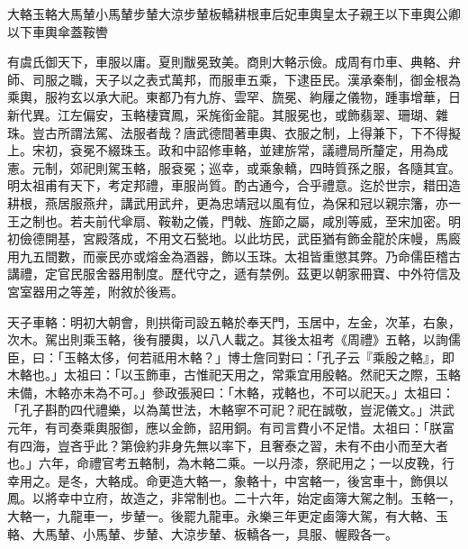 
大輅玉輅大馬輦小馬輦步輦大涼步輦板轎耕根車后妃車輿皇太子親王以下車輿公卿以下車輿傘蓋鞍轡

有虞氏御天下，車服以庸。夏則黻冕致美。商則大輅示儉。成周有巾車、典輅、弁師、司服之職，天子以之表式萬邦，而服車五乘，下逮臣民。漢承秦制，御金根為乘輿，服袀玄以承大祀。東都乃有九斿、雲罕、旒冕、絇屨之儀物，踵事增華，日新代異。江左偏安，玉輅棲寶鳳，采旄銜金龍。其服冕也，或飾翡翠、珊瑚、雜珠。豈古所謂法駕、法服者哉？唐武德間著車輿、衣服之制，上得兼下，下不得擬上。宋初，袞冕不綴珠玉。政和中詔修車輅，並建旂常，議禮局所釐定，用為成憲。元制，郊祀則駕玉輅，服袞冕；巡幸，或乘象轎，四時質孫之服，各隨其宜。明太祖甫有天下，考定邦禮，車服尚質。酌古通今，合乎禮意。迄於世宗，耤田造耕根，燕居服燕弁，講武用武弁，更為忠靖冠以風有位，為保和冠以親宗籓，亦一王之制也。若夫前代傘扇、鞍勒之儀，門戟、旌節之屬，咸別等威，至宋加密。明初儉德開基，宮殿落成，不用文石甃地。以此坊民，武臣猶有飾金龍於床幔，馬廄用九五間數，而豪民亦或熔金為酒器，飾以玉珠。太祖皆重懲其弊。乃命儒臣稽古講禮，定官民服舍器用制度。歷代守之，遞有禁例。茲更以朝家冊寶、中外符信及宮室器用之等差，附敘於後焉。

天子車輅：明初大朝會，則拱衛司設五輅於奉天門，玉居中，左金，次革，右象，次木。駕出則乘玉輅，後有腰輿，以八人載之。其後太祖考《周禮》五輅，以詢儒臣，曰：「玉輅太侈，何若祗用木輅？」博士詹同對曰：「孔子云『乘殷之輅』，即木輅也。」太祖曰：「以玉飾車，古惟祀天用之，常乘宜用殷輅。然祀天之際，玉輅未備，木輅亦未為不可。」參政張昶曰：「木輅，戎輅也，不可以祀天。」太祖曰：「孔子斟酌四代禮樂，以為萬世法，木輅寧不可祀？祀在誠敬，豈泥儀文。」洪武元年，有司奏乘輿服御，應以金飾，詔用銅。有司言費小不足惜。太祖曰：「朕富有四海，豈吝乎此？第儉約非身先無以率下，且奢泰之習，未有不由小而至大者也。」六年，命禮官考五輅制，為木輅二乘。一以丹漆，祭祀用之；一以皮鞔，行幸用之。是冬，大輅成。命更造大輅一，象輅十，中宮輅一，後宮車十，飾俱以鳳。以將幸中立府，故造之，非常制也。二十六年，始定鹵簿大駕之制。玉輅一，大輅一，九龍車一，步輦一。後罷九龍車。永樂三年更定鹵簿大駕，有大輅、玉輅、大馬輦、小馬輦、步輦、大涼步輦、板轎各一，具服、幄殿各一。

